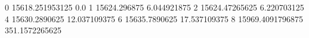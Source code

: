 0 15618.251953125 0.0
1 15624.296875 6.044921875
2 15624.47265625 6.220703125
4 15630.2890625 12.037109375
6 15635.7890625 17.537109375
8 15969.4091796875 351.1572265625
